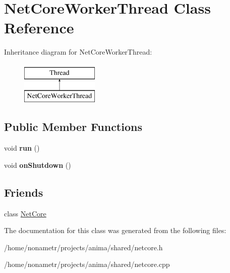 \hypertarget{classNetCoreWorkerThread}{
\section{NetCoreWorkerThread Class Reference}
\label{classNetCoreWorkerThread}
}
Inheritance diagram for NetCoreWorkerThread:\begin{figure}[H]
\begin{center}
\leavevmode
\includegraphics[height=2.000000cm]{classNetCoreWorkerThread}
\end{center}
\end{figure}
\subsection*{Public Member Functions}
\begin{DoxyCompactItemize}
\item 
\hypertarget{classNetCoreWorkerThread_a743b906293b9ed2c3bfc1749e6257187}{
void {\bfseries run} ()}
\label{classNetCoreWorkerThread_a743b906293b9ed2c3bfc1749e6257187}

\item 
\hypertarget{classNetCoreWorkerThread_a6ffdaca7b662d69cf305fbd8d9044222}{
void {\bfseries onShutdown} ()}
\label{classNetCoreWorkerThread_a6ffdaca7b662d69cf305fbd8d9044222}

\end{DoxyCompactItemize}
\subsection*{Friends}
\begin{DoxyCompactItemize}
\item 
\hypertarget{classNetCoreWorkerThread_ab3be64b93c69b019c9ecebf16700262d}{
class \hyperlink{classNetCoreWorkerThread_ab3be64b93c69b019c9ecebf16700262d}{NetCore}}
\label{classNetCoreWorkerThread_ab3be64b93c69b019c9ecebf16700262d}

\end{DoxyCompactItemize}


The documentation for this class was generated from the following files:\begin{DoxyCompactItemize}
\item 
/home/nonametr/projects/anima/shared/netcore.h\item 
/home/nonametr/projects/anima/shared/netcore.cpp\end{DoxyCompactItemize}
